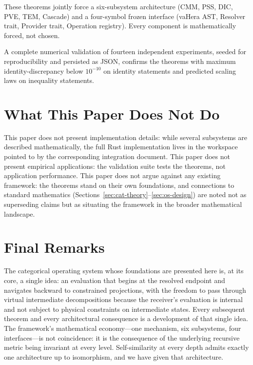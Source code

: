 \documentclass[twocolumn,a4paper]{article}
\begin{document}
These theorems jointly force a six-subsystem architecture (CMM, PSS, DIC, PVE, TEM, Cascade) and a four-symbol frozen interface (vaHera AST, Resolver trait, Provider trait, Operation registry). Every component is mathematically forced, not chosen.

A complete numerical validation of fourteen independent experiments, seeded for reproducibility and persisted as JSON, confirms the theorems with maximum identity-discrepancy below $10^{-10}$ on identity statements and predicted scaling laws on inequality statements.

\section{What This Paper Does Not Do}

This paper does not present implementation details: while several subsystems are described mathematically, the full Rust implementation lives in the workspace pointed to by the corresponding integration document. This paper does not present empirical applications: the validation suite tests the theorems, not application performance. This paper does not argue against any existing framework: the theorems stand on their own foundations, and connections to standard mathematics (Sections~\ref{sec:cat-theory}--\ref{sec:os-design}) are noted not as superseding claims but as situating the framework in the broader mathematical landscape.

\section{Final Remarks}

The categorical operating system whose foundations are presented here is, at its core, a single idea: an evaluation that begins at the resolved endpoint and navigates backward to constrained projections, with the freedom to pass through virtual intermediate decompositions because the receiver's evaluation is internal and not subject to physical constraints on intermediate states. Every subsequent theorem and every architectural consequence is a development of that single idea. The framework's mathematical economy---one mechanism, six subsystems, four interfaces---is not coincidence: it is the consequence of the underlying recursive metric being invariant at every level. Self-similarity at every depth admits exactly one architecture up to isomorphism, and we have given that architecture.



\end{document}
